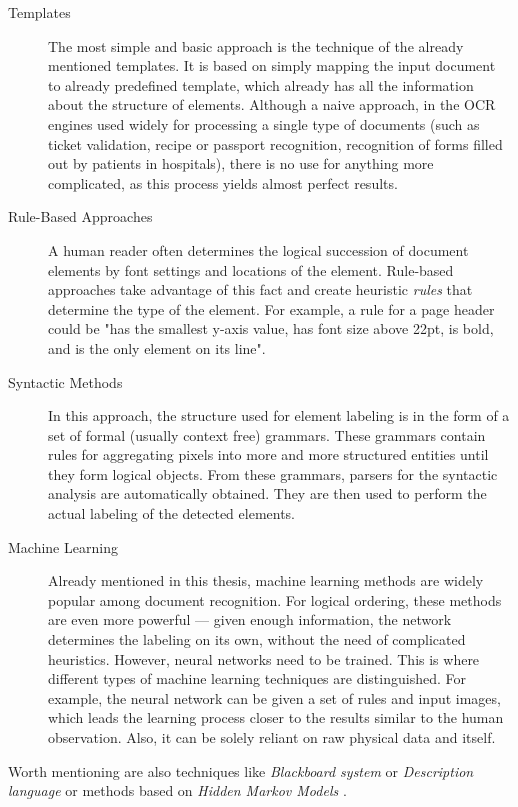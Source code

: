 \begin{description}
\item[Templates] The most simple and basic approach is the technique of the already mentioned templates. It is based on simply mapping the input document to already predefined template, which already has all the information about the structure of elements. Although a naive approach, in the OCR engines used widely for processing a single type of documents (such as ticket validation, recipe or passport recognition, recognition of forms filled out by patients in hospitals), there is no use for anything more complicated, as this process yields almost perfect results.

\item[Rule-Based Approaches] A human reader often determines the logical succession of document elements by font settings and locations of the element. Rule-based approaches take advantage of this fact and create heuristic \emph{rules} that determine the type of the element. For example, a rule for a page header could be "has the smallest y-axis value, has font size above 22pt, is bold, and is the only element on its line".

\item[Syntactic Methods] In this approach, the structure used for element labeling is in the form of a set of formal (usually context free) grammars. These grammars contain rules for aggregating pixels into more and more structured entities until they form logical objects. From these grammars, parsers for the syntactic analysis are automatically obtained. They are then used to perform the actual labeling of the detected elements.

\item[Machine Learning] Already mentioned in this thesis, machine learning methods are widely popular among document recognition. For logical ordering, these methods are even more powerful --- given enough information, the network determines the labeling on its own, without the need of complicated heuristics. However, neural networks need to be trained. This is where different types of machine learning techniques are distinguished. For example, the neural network can be given a set of rules and input images, which leads the learning process closer to the results similar to the human observation. Also, it can be solely reliant on raw physical data and itself.

\end{description}

Worth mentioning are also techniques like \emph{Blackboard system} or \emph{Description language} or methods based on \emph{Hidden Markov Models} \cite{logicalLayoutOther}.

